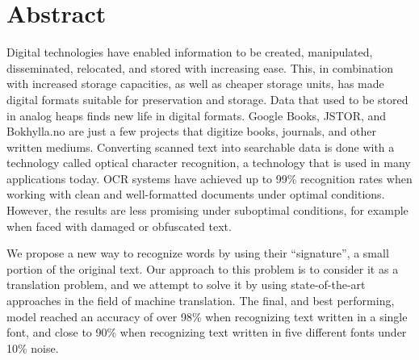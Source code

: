 
\chapter*{Abstract}
Digital technologies have enabled information to be created, manipulated, disseminated, relocated, and stored with increasing ease. This, in combination with increased storage capacities, as well as cheaper storage units, has made digital formats suitable for preservation and storage. Data that used to be stored in analog heaps finds new life in digital formats. Google Books, JSTOR, and Bokhylla.no are just a few projects that digitize books, journals, and other written mediums. Converting scanned text into searchable data is done with a technology called optical character recognition, a technology that is used in many applications today. OCR systems have achieved up to 99\% recognition rates when working with clean and well-formatted documents under optimal conditions. However, the results are less promising under suboptimal conditions, for example when faced with damaged or obfuscated text. \newline

\noindent We propose a new way to recognize words by using their ``signature'', a small portion of the original text. Our approach to this problem is to consider it as a translation problem, and we attempt to solve it by using state-of-the-art approaches in the field of machine translation. The final, and best performing, model reached an accuracy of over 98\% when recognizing text written in a single font, and close to 90\% when recognizing text written in five different fonts under 10\% noise.